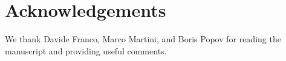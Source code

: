 \documentclass[twoside,12pt]{article}
\begin{document}



\tableofcontents





\clearpage


\clearpage




\clearpage
%



\clearpage

\clearpage

\clearpage

\clearpage





\section*{Acknowledgements}

We thank Davide Franco, Marco Martini, and Boris Popov for reading the manuscript and providing useful comments.




%



\end{document}
